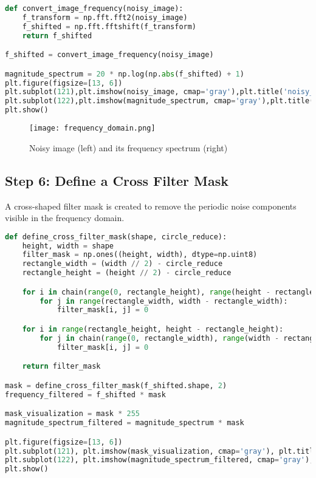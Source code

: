 \documentclass[12pt]{article}
\begin{document}
\begin{lstlisting}[language=Python]
def convert_image_frequency(noisy_image):
    f_transform = np.fft.fft2(noisy_image)
    f_shifted = np.fft.fftshift(f_transform)
    return f_shifted

f_shifted = convert_image_frequency(noisy_image)

magnitude_spectrum = 20 * np.log(np.abs(f_shifted) + 1)
plt.figure(figsize=[13, 6])
plt.subplot(121),plt.imshow(noisy_image, cmap='gray'),plt.title('noisy_image'), plt.axis('off');
plt.subplot(122),plt.imshow(magnitude_spectrum, cmap='gray'),plt.title('magnitude_spectrum'), plt.axis('off');
plt.show()
\end{lstlisting}

\begin{figure}[h]
    \centering
    \texttt{[image: frequency\_domain.png]}
    \caption{Noisy image (left) and its frequency spectrum (right)}
\end{figure}

\subsection{Step 6: Define a Cross Filter Mask}
A cross-shaped filter mask is created to remove the periodic noise components visible in the frequency domain.

\begin{lstlisting}[language=Python]
def define_cross_filter_mask(shape, circle_reduce):
    height, width = shape
    filter_mask = np.ones((height, width), dtype=np.uint8)
    rectangle_width = (width // 2) - circle_reduce
    rectangle_height = (height // 2) - circle_reduce

    for i in chain(range(0, rectangle_height), range(height - rectangle_height, height)):
        for j in range(rectangle_width, width - rectangle_width):
            filter_mask[i, j] = 0

    for i in range(rectangle_height, height - rectangle_height):
        for j in chain(range(0, rectangle_width), range(width - rectangle_width, width)):
            filter_mask[i, j] = 0

    return filter_mask

mask = define_cross_filter_mask(f_shifted.shape, 2)
frequency_filtered = f_shifted * mask

mask_visualization = mask * 255
magnitude_spectrum_filtered = magnitude_spectrum * mask

plt.figure(figsize=[13, 6])
plt.subplot(121), plt.imshow(mask_visualization, cmap='gray'), plt.title('Mask'), plt.axis('off')
plt.subplot(122), plt.imshow(magnitude_spectrum_filtered, cmap='gray'), plt.title('Filtered Frequency'), plt.axis('off')
plt.show()
\end{lstlisting}
\end{document}
